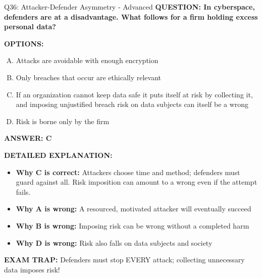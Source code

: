 \documentclass[8pt]{beamer}
\begin{document}
\begin{frame}[shrink=6]{Q36: Attacker-Defender Asymmetry - Advanced}
\fontsize{6.5}{7.5}\selectfont
\textbf{QUESTION: In cyberspace, defenders are at a disadvantage. What follows for a firm holding excess personal data?}

\vspace{0.1cm}
\textbf{OPTIONS:}
\begin{enumerate}[A.]
\item Attacks are avoidable with enough encryption
\item Only breaches that occur are ethically relevant
\item If an organization cannot keep data safe it puts itself at risk by collecting it, and imposing unjustified breach risk on data subjects can itself be a wrong
\item Risk is borne only by the firm
\end{enumerate}

\vspace{0.1cm}
\textcolor{myblue}{\textbf{ANSWER: C}}

\vspace{0.1cm}
\textbf{DETAILED EXPLANATION:}
\begin{itemize}
\item \textbf{Why C is correct:} Attackers choose time and method; defenders must guard against all. Risk imposition can amount to a wrong even if the attempt fails.
\item \textbf{Why A is wrong:} A resourced, motivated attacker will eventually succeed
\item \textbf{Why B is wrong:} Imposing risk can be wrong without a completed harm
\item \textbf{Why D is wrong:} Risk also falls on data subjects and society
\end{itemize}

\textcolor{myred}{\textbf{EXAM TRAP:}} Defenders must stop EVERY attack; collecting unnecessary data imposes risk!
\end{frame}
\end{document}
